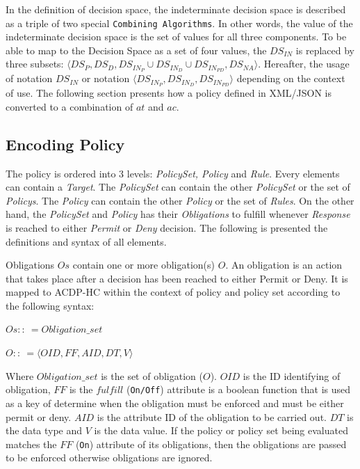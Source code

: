 \documentclass[conference]{IEEEtran}
\begin{document}
In the definition of decision space, the indeterminate decision space is described as a triple of two special \texttt{Combining Algorithms}. 
In other words, the value of the indeterminate decision space is the set of values for all three components. 
To be able to map to the Decision Space as a set of four values, the $DS_{IN}$ is replaced by three subsets: $\langle DS_P , DS_D, DS_{IN_P} \cup DS_{IN_D} \cup DS_{IN_{PD}}, DS_{NA} \rangle$. 
Hereafter, the usage of notation $DS_{IN}$ or notation $\langle DS_{IN_{P}}, DS_{IN_{D}}, DS_{IN_{PD}} \rangle$ depending on the context of use. 
The following section presents how a policy defined in XML/JSON is converted  to a combination of $at$ and $ac$. %

\subsection{Encoding Policy}\label{Back:policy}


The policy is ordered into 3 levels: \textit{PolicySet, Policy} and \textit{Rule}. 
Every elements can contain a \textit{Target}. The \textit{PolicySet} can contain the other \textit{PolicySet} or the set of \textit{Policys}.
The \textit{Policy} can contain the other \textit{Policy} or the set of \textit{Rules}.
On the other hand, the \textit{PolicySet} and \textit{Policy} has their \textit{Obligations} to fulfill whenever \textit{Response} is reached to either \textit{Permit} or \textit{Deny} decision. 
The following is presented the definitions and syntax of all elements.

Obligations $Os$ contain one or more obligation(s) $O$. 
An obligation is an action that takes place after a decision has been reached to either Permit or Deny.
It is mapped to ACDP-HC within the context of policy and policy set according to the following syntax:

$Os ::\: = Obligation\_set$

$O ::\:= \langle OID, FF, {AID, DT, V} \rangle$

Where $Obligation\_set$ is the set of obligation ($O$). 
$OID$ is the ID identifying of obligation, $FF$ is the $fulfill$ (\texttt{On/Off}) attribute is a boolean function that is used as a key of determine when the obligation must be enforced and must be either permit or deny.  
$AID$ is the attribute ID of the obligation to be carried out. $DT$ is the data type and $V$ is the data value. 
If the policy or policy set being evaluated matches the $FF$ (\texttt{On}) attribute of its obligations, then the obligations are passed to be enforced otherwise obligations are ignored.
\end{document}
